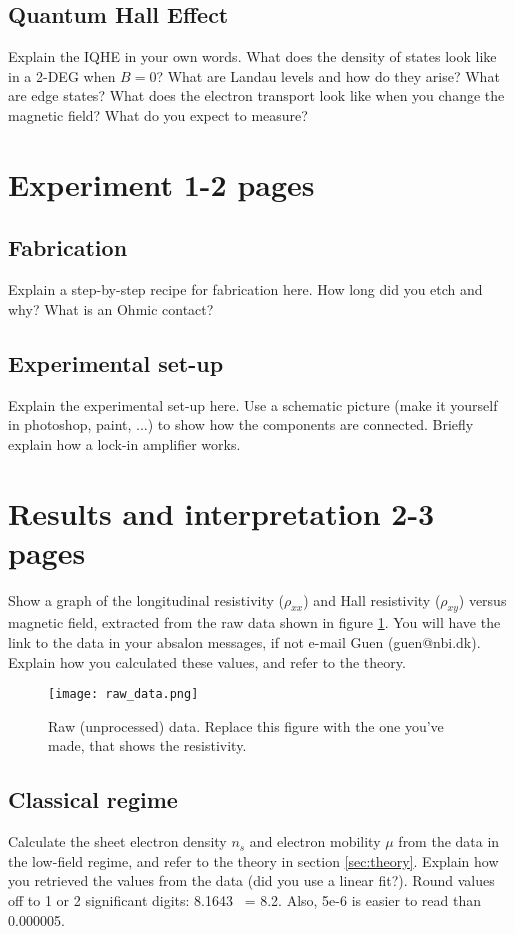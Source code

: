\documentclass[a4paper]{article}
\begin{document}
    \subsection{Quantum Hall Effect}
    Explain the IQHE in your own words. What does the density of states look like in a 2-DEG when $B=0$? What are Landau levels and how do they arise? What are edge states? What does the electron transport look like when you change the magnetic field? What do you expect to measure?
    
    \section{Experiment 1-2 pages}
    \subsection{Fabrication}
    Explain a step-by-step recipe for fabrication here. How long did you etch and why? What is an Ohmic contact?
    \subsection{Experimental set-up}
    Explain the experimental set-up here. Use a schematic picture (make it yourself in photoshop, paint, ...) to show how the components are connected. Briefly explain how a lock-in amplifier works.
    
    \section{Results and interpretation 2-3 pages}
    Show a graph of the longitudinal resistivity ($\rho_{xx}$) and Hall resistivity ($\rho_{xy}$) versus magnetic field, extracted from the raw data shown in figure \ref{fig:data}. You will have the link to the data in your absalon messages, if not e-mail Guen (guen@nbi.dk). Explain how you calculated these values, and refer to the theory.
    
    \begin{figure}
    \centering
    \texttt{[image: raw\_data.png]}
    \caption{\label{fig:data}Raw (unprocessed) data. Replace this figure with the one you've made, that shows the resistivity.}
    \end{figure}
    
    \subsection{Classical regime}
    Calculate the sheet electron density $n_{s}$ and electron mobility $\mu$ from the data in the low-field regime, and refer to the theory in section \ref{sec:theory}. Explain how you retrieved the values from the data (did you use a linear fit?).
    Round values off to 1 or 2 significant digits: 8.1643 ~= 8.2. Also, 5e-6 is easier to read than 0.000005.
    
\end{document}
